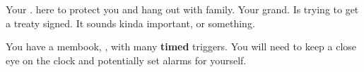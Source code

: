 \documentclass[char]{NeptuneBall}
\begin{document}
%
%
%

\begin{contacts}
  \contact{\cAriel{}} Your \cAriel{\parent}. \cAriel{\They} \cAriel{\are} here to protect you and hang out with \cAriel{\their} family.
	\contact{\cKing{}} Your grand\cKing{\parent}. Is trying to get a treaty signed. It sounds kinda important, or something.
\end{contacts}

\begin{itemz}[Notes]
	\item You have a membook, \mExplosion{}, with many {\bf timed} triggers.  You will need to keep a close eye on the clock and potentially set alarms for yourself.
\end{itemz}
\end{document}
